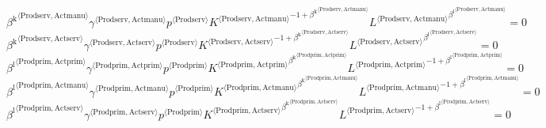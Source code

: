 \begin{equation}
{{\beta^{\mathrm{k}}}^{\langle \mathrm{\mathrm{Prodserv}},\mathrm{\mathrm{Actmanu}}\rangle}} {{\gamma}^{\langle \mathrm{\mathrm{Prodserv}},\mathrm{\mathrm{Actmanu}}\rangle}} {{p}^{\langle \mathrm{Prodserv}\rangle}} {{{K}^{\langle \mathrm{Prodserv},\mathrm{Actmanu}\rangle}}^{-1 + {\beta^{\mathrm{k}}}^{\langle \mathrm{\mathrm{Prodserv}},\mathrm{\mathrm{Actmanu}}\rangle}}} {{{L}^{\langle \mathrm{Prodserv},\mathrm{Actmanu}\rangle}}^{{\beta^{\mathrm{l}}}^{\langle \mathrm{\mathrm{Prodserv}},\mathrm{\mathrm{Actmanu}}\rangle}}} = 0
\end{equation}
\begin{equation}
{{\beta^{\mathrm{k}}}^{\langle \mathrm{\mathrm{Prodserv}},\mathrm{\mathrm{Actserv}}\rangle}} {{\gamma}^{\langle \mathrm{\mathrm{Prodserv}},\mathrm{\mathrm{Actserv}}\rangle}} {{p}^{\langle \mathrm{Prodserv}\rangle}} {{{K}^{\langle \mathrm{Prodserv},\mathrm{Actserv}\rangle}}^{-1 + {\beta^{\mathrm{k}}}^{\langle \mathrm{\mathrm{Prodserv}},\mathrm{\mathrm{Actserv}}\rangle}}} {{{L}^{\langle \mathrm{Prodserv},\mathrm{Actserv}\rangle}}^{{\beta^{\mathrm{l}}}^{\langle \mathrm{\mathrm{Prodserv}},\mathrm{\mathrm{Actserv}}\rangle}}} = 0
\end{equation}
\begin{equation}
{{\beta^{\mathrm{l}}}^{\langle \mathrm{\mathrm{Prodprim}},\mathrm{\mathrm{Actprim}}\rangle}} {{\gamma}^{\langle \mathrm{\mathrm{Prodprim}},\mathrm{\mathrm{Actprim}}\rangle}} {{p}^{\langle \mathrm{Prodprim}\rangle}} {{{K}^{\langle \mathrm{Prodprim},\mathrm{Actprim}\rangle}}^{{\beta^{\mathrm{k}}}^{\langle \mathrm{\mathrm{Prodprim}},\mathrm{\mathrm{Actprim}}\rangle}}} {{{L}^{\langle \mathrm{Prodprim},\mathrm{Actprim}\rangle}}^{-1 + {\beta^{\mathrm{l}}}^{\langle \mathrm{\mathrm{Prodprim}},\mathrm{\mathrm{Actprim}}\rangle}}} = 0
\end{equation}
\begin{equation}
{{\beta^{\mathrm{l}}}^{\langle \mathrm{\mathrm{Prodprim}},\mathrm{\mathrm{Actmanu}}\rangle}} {{\gamma}^{\langle \mathrm{\mathrm{Prodprim}},\mathrm{\mathrm{Actmanu}}\rangle}} {{p}^{\langle \mathrm{Prodprim}\rangle}} {{{K}^{\langle \mathrm{Prodprim},\mathrm{Actmanu}\rangle}}^{{\beta^{\mathrm{k}}}^{\langle \mathrm{\mathrm{Prodprim}},\mathrm{\mathrm{Actmanu}}\rangle}}} {{{L}^{\langle \mathrm{Prodprim},\mathrm{Actmanu}\rangle}}^{-1 + {\beta^{\mathrm{l}}}^{\langle \mathrm{\mathrm{Prodprim}},\mathrm{\mathrm{Actmanu}}\rangle}}} = 0
\end{equation}
\begin{equation}
{{\beta^{\mathrm{l}}}^{\langle \mathrm{\mathrm{Prodprim}},\mathrm{\mathrm{Actserv}}\rangle}} {{\gamma}^{\langle \mathrm{\mathrm{Prodprim}},\mathrm{\mathrm{Actserv}}\rangle}} {{p}^{\langle \mathrm{Prodprim}\rangle}} {{{K}^{\langle \mathrm{Prodprim},\mathrm{Actserv}\rangle}}^{{\beta^{\mathrm{k}}}^{\langle \mathrm{\mathrm{Prodprim}},\mathrm{\mathrm{Actserv}}\rangle}}} {{{L}^{\langle \mathrm{Prodprim},\mathrm{Actserv}\rangle}}^{-1 + {\beta^{\mathrm{l}}}^{\langle \mathrm{\mathrm{Prodprim}},\mathrm{\mathrm{Actserv}}\rangle}}} = 0
\end{equation}
